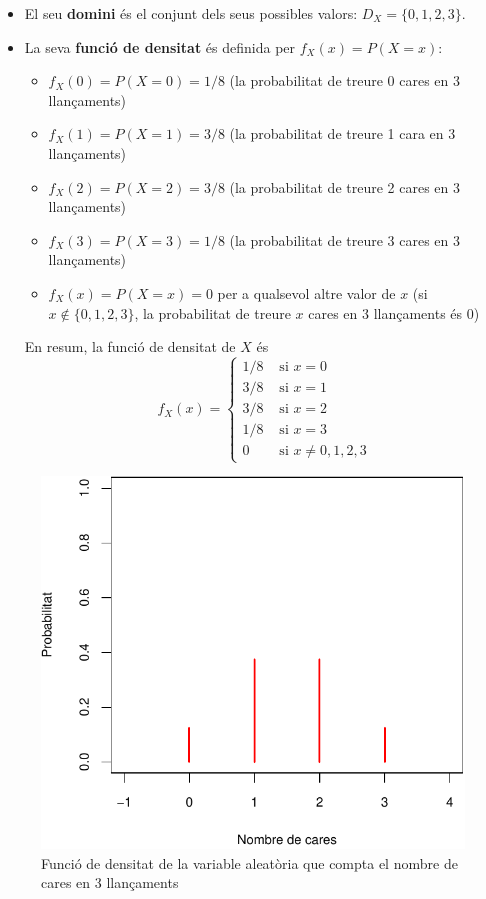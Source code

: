 \documentclass[
]{book}
\providecommand{\tightlist}{%
  \setlength{\itemsep}{0pt}\setlength{\parskip}{0pt}}
\theoremstyle{definition}
\theoremstyle{definition}
\theoremstyle{definition}
\theoremstyle{remark}
\begin{document}
\begin{itemize}
\item
  El seu \textbf{domini} és el conjunt dels seus possibles valors: \(D_X=\{0,1,2,3\}\).
\item
  La seva \textbf{funció de densitat} és definida per \(f_X(x)=P(X=x)\):

  \begin{itemize}
  \tightlist
  \item
    \(f_X(0)=P(X=0)=1/8\) (la probabilitat de treure 0 cares en 3 llançaments)
  \item
    \(f_X(1)=P(X=1)=3/8\) (la probabilitat de treure 1 cara en 3 llançaments)
  \item
    \(f_X(2)=P(X=2)=3/8\) (la probabilitat de treure 2 cares en 3 llançaments)
  \item
    \(f_X(3)=P(X=3)=1/8\) (la probabilitat de treure 3 cares en 3 llançaments)
  \item
    \(f_X(x)=P(X=x)=0\) per a qualsevol altre valor de \(x\) (si \(x\notin\{0,1,2,3\}\), la probabilitat de treure \(x\) cares en 3 llançaments és 0)
  \end{itemize}

  En resum, la funció de densitat de \(X\) és
  \[
  f_X(x) =\left\{
  \begin{array}{ll}
  1/8 & \text{ si $x=0$}\\ 
  3/8 & \text{ si $x=1$}\\ 
  3/8 & \text{ si $x=2$}\\ 
  1/8 & \text{ si $x=3$}\\
  0 & \text{ si $x\neq 0,1,2,3$}
  \end{array}
  \right.
  \]
\end{itemize}

\begin{figure}

{\centering \includegraphics[width=0.6\linewidth]{Bioestadistica-II_files/figure-latex/densicares-1} 

}

\caption{Funció de densitat de la variable aleatòria que compta el nombre de cares en 3 llançaments}\label{fig:densicares}
\end{figure}
\end{document}
